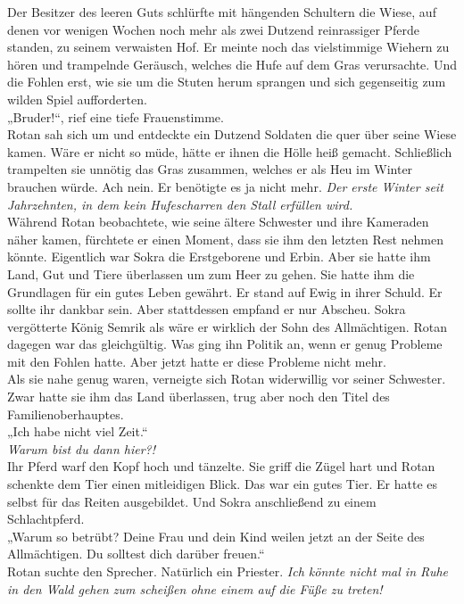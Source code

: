 Der Besitzer des leeren Guts schlürfte mit hängenden Schultern die Wiese, auf denen vor wenigen 
Wochen noch mehr als zwei Dutzend reinrassiger Pferde standen, zu seinem verwaisten Hof. Er 
meinte noch das vielstimmige Wiehern zu hören und trampelnde Geräusch, welches die Hufe auf dem 
Gras verursachte. Und die Fohlen erst, wie sie um die Stuten herum sprangen und sich gegenseitig 
zum wilden Spiel aufforderten.\\
„Bruder!“, rief eine tiefe Frauenstimme.\\
Rotan sah sich um und entdeckte ein Dutzend Soldaten die quer über seine Wiese kamen. Wäre er nicht 
so müde, hätte er ihnen die Hölle heiß gemacht. Schließlich trampelten sie unnötig das Gras 
zusammen, welches er als Heu im Winter brauchen würde. Ach nein. Er benötigte es ja nicht mehr. 
\textit{Der erste Winter seit Jahrzehnten, in dem kein Hufescharren den Stall erfüllen wird.}\\ 
Während Rotan beobachtete, wie seine ältere Schwester und ihre Kameraden näher kamen, fürchtete er 
einen Moment, dass sie ihm den letzten Rest nehmen könnte. Eigentlich war Sokra die Erstgeborene 
und Erbin. Aber sie hatte ihm Land, Gut und Tiere überlassen um zum Heer zu gehen. Sie hatte ihm 
die Grundlagen für ein gutes Leben gewährt. Er stand auf Ewig in ihrer Schuld. Er sollte ihr 
dankbar sein. Aber stattdessen empfand er nur Abscheu. Sokra vergötterte König Semrik als wäre er 
wirklich der Sohn des Allmächtigen. Rotan dagegen war das gleichgültig. Was ging ihn Politik an, 
wenn er genug Probleme mit den Fohlen hatte. Aber jetzt hatte er diese Probleme nicht mehr.\\
Als sie nahe genug waren, verneigte sich Rotan widerwillig vor seiner Schwester. Zwar hatte sie ihm 
das Land überlassen, trug aber noch den Titel des Familienoberhauptes.\\
„Ich habe nicht viel Zeit.“\\
\textit{Warum bist du dann hier?!}\\
Ihr Pferd warf den Kopf hoch und tänzelte. Sie griff die Zügel hart und Rotan schenkte dem Tier 
einen mitleidigen Blick. Das war ein gutes Tier. Er hatte es selbst für das Reiten ausgebildet. 
Und Sokra anschließend zu einem Schlachtpferd.\\
„Warum so betrübt? Deine Frau und dein Kind weilen jetzt an der Seite des Allmächtigen. Du solltest 
dich darüber freuen.``\\
Rotan suchte den Sprecher. Natürlich ein Priester. \textit{Ich könnte nicht mal in Ruhe in den Wald 
gehen zum scheißen ohne einem auf die Füße zu treten!}\\
